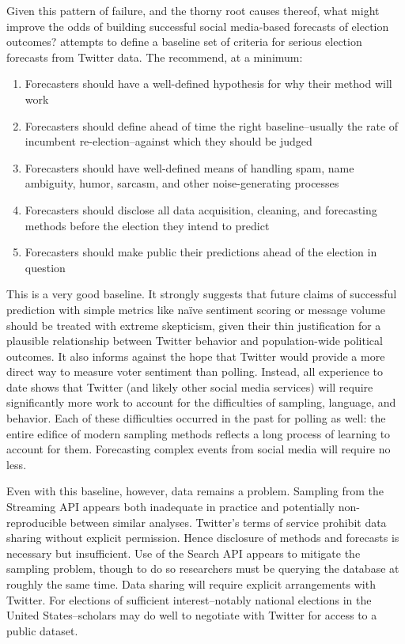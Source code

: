 \documentclass{article}
\begin{document}
Given this pattern of failure, and the thorny root causes thereof,
what might improve the odds of building successful social media-based
forecasts of election outcomes? \cite{gayo2012wanted} attempts to
define a baseline set of criteria for serious election forecasts from
Twitter data. The recommend, at a minimum:

\begin{enumerate}
\item Forecasters should have a well-defined hypothesis for why their
  method will work
\item Forecasters should define ahead of time the right
  baseline--usually the rate of incumbent re-election--against which
  they should be judged
\item Forecasters should have well-defined means of handling spam,
  name ambiguity, humor, sarcasm, and other noise-generating processes
\item Forecasters should disclose all data acquisition, cleaning, and
  forecasting methods before the election they intend to predict
\item Forecasters should make public their predictions ahead of the election in question
\end{enumerate}

This is a very good baseline. It strongly suggests that future claims
of successful prediction with simple metrics like na\"ive sentiment
scoring or message volume should be treated with extreme skepticism,
given their thin justification for a plausible relationship between
Twitter behavior and population-wide political outcomes. It also
informs against the hope that Twitter would provide a more direct way
to measure voter sentiment than polling. Instead, all experience to
date shows that Twitter (and likely other social media services) will
require significantly more work to account for the difficulties of
sampling, language, and behavior. Each of these difficulties occurred
in the past for polling as well: the entire edifice of modern sampling
methods reflects a long process of learning to account for
them. Forecasting complex events from social media will require no
less.
 
Even with this baseline, however, data remains a problem. Sampling
from the Streaming API appears both inadequate in practice and
potentially non-reproducible between similar analyses. Twitter's terms
of service prohibit data sharing without explicit permission. Hence
disclosure of methods and forecasts is necessary but insufficient. Use
of the Search API appears to mitigate the sampling problem, though to
do so researchers must be querying the database at roughly the same
time. Data sharing will require explicit arrangements with
Twitter. For elections of sufficient interest--notably national
elections in the United States--scholars may do well to negotiate with
Twitter for access to a public dataset.
\end{document}
